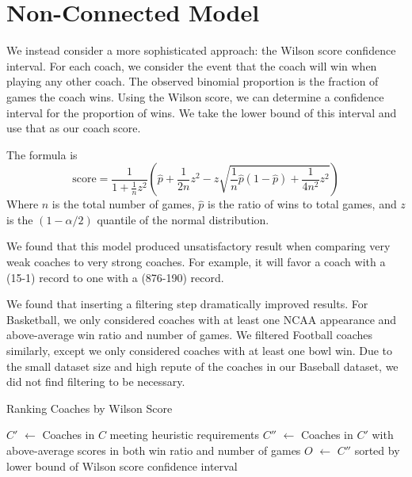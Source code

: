 \documentclass[12pt]{article}
\newcommand*\Let[2]{\State #1 $\gets$ #2}
\begin{document}
\section{Non-Connected Model}
We instead consider a more sophisticated approach: the Wilson score confidence interval. For each coach, we consider the event that the coach will win when playing any other coach. The observed binomial proportion is the fraction of games the coach wins. Using the Wilson score, we can determine a confidence interval for the proportion of wins. We take the lower bound of this interval and use that as our coach score.

The formula is
\[ \mathrm{score} = 
  \frac{1}{1 + \frac{1}{n} z^2}
  \left(
    \hat p + \frac{1}{2n} z^2 -
    z \sqrt{
      \frac{1}{n}\hat p \left(1 - \hat p\right) +
      \frac{1}{4n^2}z^2
    } 
   \right)
\]
Where $n$ is the total number of games, $\hat{p}$ is the ratio of wins to total games, and $z$ is the $(1 - \alpha/2)$ quantile of the normal distribution.

We found that this model produced unsatisfactory result when comparing very weak coaches to very strong coaches. For example, it will favor a coach with a (15-1) record to one with a (876-190) record.

We found that inserting a filtering step dramatically improved results. For Basketball, we only considered coaches with at least one NCAA appearance and above-average win ratio and number of games. We filtered Football coaches similarly, except we only considered coaches with at least one bowl win. Due to the small dataset size and high repute of the coaches in our Baseball dataset, we did not find filtering to be necessary.

\renewcommand{\algorithmicrequire}{\textbf{Input:}}
\renewcommand{\algorithmicensure}{\textbf{Output:}}
\begin{algorithm}[H]
  \caption{Ranking Coaches by Wilson Score}
  \begin{algorithmic}
	\Let{$C'$}{Coaches in $C$ meeting heuristic requirements}
	\Let{$C''$}{Coaches in $C'$ with above-average scores in both win ratio and number of games}
	\Let{$O$}{$C''$ sorted by lower bound of Wilson score confidence interval}
  \end{algorithmic}
\end{algorithm}
\end{document}

